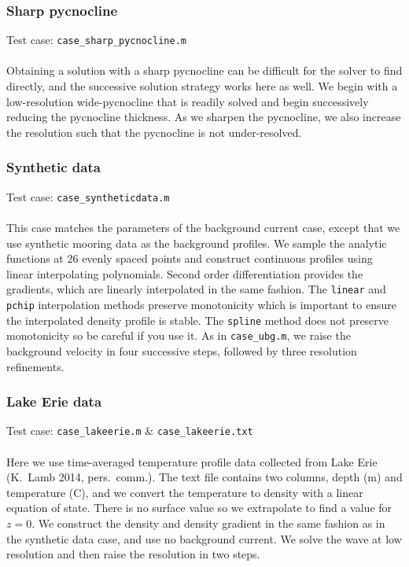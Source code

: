 \documentclass[letterpaper]{article}
\begin{document}
\subsubsection{Sharp pycnocline}
Test case: \verb"case_sharp_pycnocline.m" \\\\
Obtaining a solution with a sharp pycnocline can be difficult for the solver to find directly, and the successive solution strategy works here as well.
We begin with a low-resolution wide-pycnocline that is readily solved and begin successively reducing the pycnocline thickness.
As we sharpen the pycnocline, we also increase the resolution such that the pycnocline is not under-resolved.

\subsubsection{Synthetic data}
Test case: \verb"case_syntheticdata.m" \\\\
This case matches the parameters of the background current case, except that we use synthetic mooring data as the background profiles.
We sample the analytic functions at 26 evenly spaced points and construct continuous profiles using linear interpolating polynomials.
Second order differentiation provides the gradients, which are linearly interpolated in the same fashion.
The \verb+linear+ and \verb+pchip+ interpolation methods preserve monotonicity which is important to ensure the interpolated density profile is stable.
The \verb+spline+ method does not preserve monotonicity so be careful if you use it.
As in \verb"case_ubg.m", we raise the background velocity in four successive steps, followed by three resolution refinements.

\subsubsection{Lake Erie data}
Test case: \verb"case_lakeerie.m" \&  \verb"case_lakeerie.txt" \\\\
Here we use time-averaged temperature profile data collected from Lake Erie (K.~Lamb 2014, pers.~comm.).
The text file contains two columns, depth (m) and temperature (\textdegree C), and we convert the temperature to density with a linear equation of state.
There is no surface value so we extrapolate to find a value for $z=0$.
We construct the density and density gradient in the same fashion as in the synthetic data case, and use no background current.
We solve the wave at low resolution and then raise the resolution in two steps.
\end{document}

